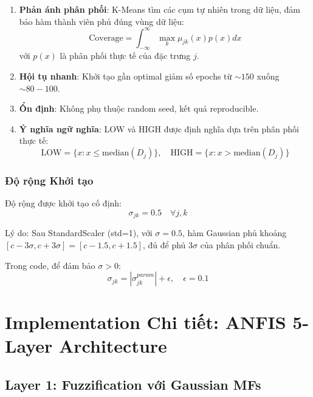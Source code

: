 \documentclass[12pt,a4paper]{article}
\begin{document}
\begin{enumerate}
    \item \textbf{Phản ánh phân phối}: K-Means tìm các cụm tự nhiên trong dữ liệu, đảm bảo hàm thành viên phủ đúng vùng dữ liệu:
    \begin{equation}
    \text{Coverage} = \int_{-\infty}^{\infty} \max_k \mu_{jk}(x) p(x) dx
    \end{equation}
    với $p(x)$ là phân phối thực tế của đặc trưng $j$.
    
    \item \textbf{Hội tụ nhanh}: Khởi tạo gần optimal giảm số epochs từ $\sim 150$ xuống $\sim 80-100$.
    
    \item \textbf{Ổn định}: Không phụ thuộc random seed, kết quả reproducible.
    
    \item \textbf{Ý nghĩa ngữ nghĩa}: LOW và HIGH được định nghĩa dựa trên phân phối thực tế:
    \begin{equation}
    \text{LOW} = \{x : x \leq \text{median}(D_j)\}, \quad \text{HIGH} = \{x : x > \text{median}(D_j)\}
    \end{equation}
\end{enumerate}

\subsubsection{Độ rộng Khởi tạo}

Độ rộng được khởi tạo cố định:
\begin{equation}
\sigma_{jk} = 0.5 \quad \forall j,k
\end{equation}

Lý do: Sau StandardScaler (std=1), với $\sigma=0.5$, hàm Gaussian phủ khoảng $[c-3\sigma, c+3\sigma] = [c-1.5, c+1.5]$, đủ để phủ $3\sigma$ của phân phối chuẩn.

Trong code, để đảm bảo $\sigma > 0$:
\begin{equation}
\sigma_{jk} = |\sigma_{jk}^{param}| + \epsilon, \quad \epsilon = 0.1
\end{equation}

\section{Implementation Chi tiết: ANFIS 5-Layer Architecture}

\subsection{Layer 1: Fuzzification với Gaussian MFs}
\end{document}
